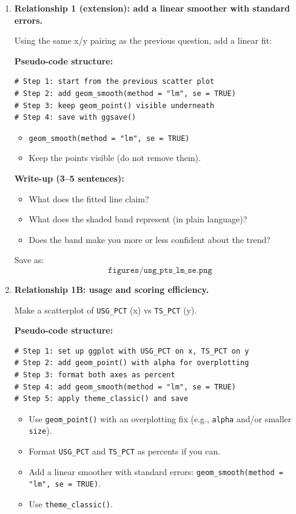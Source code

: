 \documentclass[11pt]{article}
\begin{document}
\begin{enumerate}
  \noindent Save as:
  \[
    \texttt{figures/usg\_pts\_scatter.png}
  \]

  \item \textbf{Relationship 1 (extension): add a linear smoother with standard errors.}

  Using the same x/y pairing as the previous question, add a linear fit:

  \textbf{Pseudo-code structure:}
\begin{verbatim}
# Step 1: start from the previous scatter plot
# Step 2: add geom_smooth(method = "lm", se = TRUE)
# Step 3: keep geom_point() visible underneath
# Step 4: save with ggsave()
\end{verbatim}

  \begin{itemize}
    \item \texttt{geom\_smooth(method = "lm", se = TRUE)}
    \item Keep the points visible (do not remove them).
  \end{itemize}

  \noindent \textbf{Write-up (3--5 sentences):}
  \begin{itemize}
    \item What does the fitted line claim?
    \item What does the shaded band represent (in plain language)?
    \item Does the band make you more or less confident about the trend?
  \end{itemize}

  \noindent Save as:
  \[
    \texttt{figures/usg\_pts\_lm\_se.png}
  \]

  
  \item \textbf{Relationship 1B: usage and scoring efficiency.}

  Make a scatterplot of \texttt{USG\_PCT} (x) vs \texttt{TS\_PCT} (y).

  \textbf{Pseudo-code structure:}
\begin{verbatim}
# Step 1: set up ggplot with USG_PCT on x, TS_PCT on y
# Step 2: add geom_point() with alpha for overplotting
# Step 3: format both axes as percent
# Step 4: add geom_smooth(method = "lm", se = TRUE)
# Step 5: apply theme_classic() and save
\end{verbatim}

  \begin{itemize}
    \item Use \texttt{geom\_point()} with an overplotting fix (e.g., \texttt{alpha} and/or smaller \texttt{size}).
    \item Format \texttt{USG\_PCT} and \texttt{TS\_PCT} as percents if you can.
    \item Add a linear smoother with standard errors: \texttt{geom\_smooth(method = "lm", se = TRUE)}.
    \item Use \texttt{theme\_classic()}.
  \end{itemize}


\end{enumerate}
\end{document}
